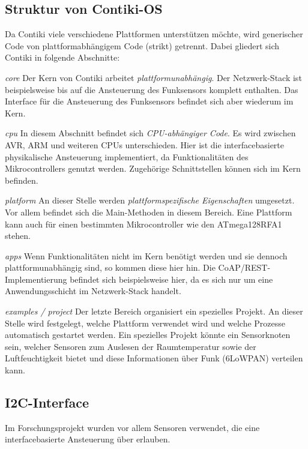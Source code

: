 \subsection{Struktur von Contiki-OS}
	Da Contiki viele verschiedene Plattformen unterstützen möchte,
	wird generischer Code von plattformabhängigem Code (strikt) getrennt.
	Dabei gliedert sich Contiki in folgende Abschnitte:
	\begin{LaTeXdescription}
	\item[\normalfont\itshape core]
		Der Kern von Contiki arbeitet \emph{plattformunabhängig}.
		Der Netzwerk-Stack ist beispielsweise bis auf die Ansteuerung
		des Funksensors komplett enthalten. Das Interface für die
		Ansteuerung des Funksensors befindet sich aber wiederum
		im Kern.
	\item[\normalfont\itshape cpu]
		In diesem Abschnitt befindet sich \emph{CPU-abhängiger Code}.
		Es wird zwischen AVR, ARM und weiteren CPUs unterschieden.
		Hier ist \iA die interfacebasierte physikalische Ansteuerung
		implementiert, da Funktionalitäten des Mikrocontrollers genutzt
		werden. Zugehörige Schnittstellen können sich im Kern befinden.
	\item[\normalfont\itshape platform]
		An dieser Stelle werden \emph{plattformspezifische
		Eigenschaften}
		umgesetzt. Vor allem befindet sich die Main-Methoden in diesem
		Bereich. Eine Plattform kann auch für einen bestimmten
		Mikrocontroller wie den ATmega128RFA1 stehen.
	\item[\normalfont\itshape apps]
		Wenn Funktionalitäten nicht im Kern benötigt werden und sie
		dennoch plattformunabhängig sind, so kommen diese hier hin.
		Die CoAP/REST-Implementierung befindet sich beispielsweise
		hier, da es sich nur um eine Anwendungsschicht im
		Netzwerk-Stack handelt.
	\item[\normalfont\itshape examples / project]
		Der letzte Bereich organisiert ein spezielles Projekt.
		An dieser Stelle wird festgelegt, welche Plattform verwendet
		wird und welche Prozesse automatisch gestartet werden.
		Ein spezielles Projekt könnte ein Sensorknoten sein, welcher
		Sensoren zum Auslesen der Raumtemperatur sowie der
		Luftfeuchtigkeit bietet und diese Informationen über Funk
		(6LoWPAN) verteilen kann.
	\end{LaTeXdescription}


\subsection{I2C-Interface}
	Im Forschungsprojekt wurden vor allem Sensoren verwendet, die
	eine interfacebasierte Ansteuerung über \ItC erlauben.

